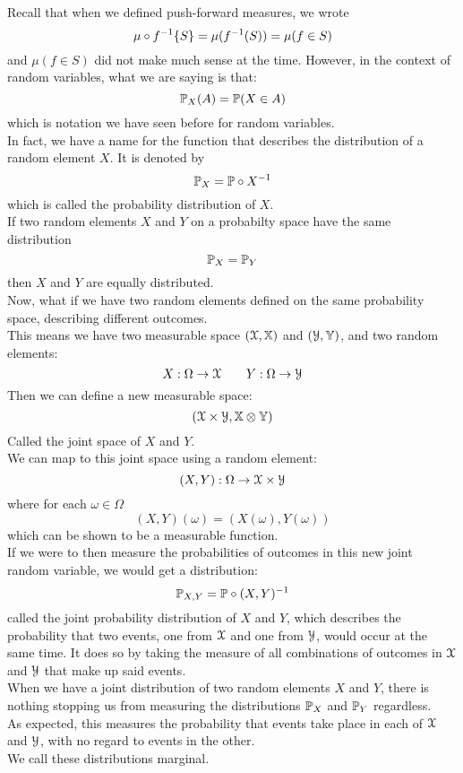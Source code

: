 \documentclass[12pt]{article}
\begin{document}
    Recall that when we defined
    push-forward measures,
    we wrote
    \[ \mu \circ f^{-1} \{S\} = \mu(f^{-1} (S)) 
    = \mu(f \in S) \]
    and 
    $\mu(f \in S)$
    did not make much sense at the time.
    However, in the context of random variables,
    what we are saying is that:
    \[ \mathbb{P}_X(A) = \mathbb{P}(X \in A) \]
    which is notation we have seen before
    for random variables. \\

    In fact, we have a name for the
    function that describes the distribution
    of a random element $X$.
    It is denoted by 
    \[ \mathbb{P}_X = \mathbb{P} \circ X^{-1} \]
    which is called the probability
    distribution of $X$. \\

    If two random elements $X$ and $Y$
    on a probabilty space
    have the same distribution
    \[ \mathbb{P}_X = \mathbb{P}_Y \]
    then $X$ and $Y$ are equally
    distributed. \\

    Now, what if we have two random elements
    defined on the same probability space,
    describing different outcomes. \\
    This means we have two measurable
    space $(\mathcal{X}, \mathbb{X})$
    and $(\mathcal{Y}, \mathbb{Y})$,
    and two random elements:
    \[ X: \Omega \to \mathcal{X} \qquad 
    Y: \Omega \to \mathcal{Y} \]
    Then we can define a new measurable space:
    \[ (\mathcal{X} \times \mathcal{Y}, \mathbb{X} \otimes \mathbb{Y}) \]
    Called the joint space of $X$
    and $Y$. \\
    We can map to this joint space using
    a random element:
    \[ (X, Y): \Omega \to \mathcal{X} \times \mathcal{Y}  \]
    where for each $\omega \in \Omega$
    \[ (X, Y)(\omega) = (X(\omega), Y(\omega)) \]
    which can be shown to be a measurable
    function. \\
    If we were to then measure the probabilities
    of outcomes in this new joint random variable,
    we would get a distribution:
    \[ \mathbb{P}_{X, Y} = \mathbb{P} \circ (X, Y)^{-1} \]
    called the joint probability distribution
    of $X$ and $Y$,
    which describes the probability that 
    two events, one from $\mathcal{X}$
    and one from $\mathcal{Y}$,
    would occur at the same time.
    It does so by taking the measure of all
    combinations of outcomes in
    $\mathcal{X}$ and $\mathcal{Y}$ that make up
    said events. \\

    When we have a joint distribution
    of two random elements $X$ and $Y$,
    there is nothing stopping us from measuring
    the distributions $\mathbb{P}_X$ and $\mathbb{P}_Y$
    regardless. \\
    As expected, this measures the probability
    that events take place in each of
    $\mathcal{X}$ and $\mathcal{Y}$,
    with no regard to events in the other. \\
    We call these distributions marginal. \\
\end{document}
